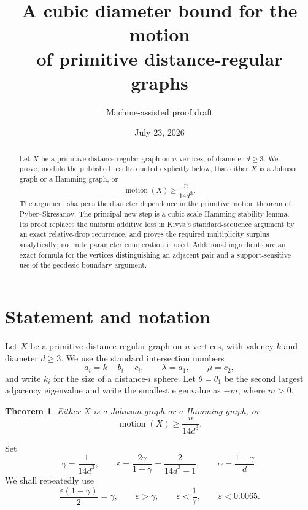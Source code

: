 \documentclass[11pt]{amsart}
\title[A cubic diameter bound for motion]{A cubic diameter bound for the motion\\of primitive distance-regular graphs}
\author{Machine-assisted proof draft}
\date{July 23, 2026}
\newtheorem{theorem}{Theorem}[section]
\theoremstyle{definition}
\newcommand{\mot}{\operatorname{motion}}
\newcommand{\eps}{\varepsilon}
\newcommand{\gam}{\gamma}
\begin{document}
\begin{abstract}
Let $X$ be a primitive distance-regular graph on $n$ vertices, of diameter $d\ge3$.
We prove, modulo the published results quoted explicitly below, that either $X$ is a Johnson graph or a Hamming graph, or
\[
 \mot(X)\ge \frac{n}{14d^3}.
\]
The argument sharpens the diameter dependence in the primitive motion theorem of Pyber--Skresanov.  The principal new step is a cubic-scale Hamming stability lemma.  Its proof replaces the uniform additive loss in Kivva's standard-sequence argument by an exact relative-drop recurrence, and proves the required multiplicity surplus analytically; no finite parameter enumeration is used.  Additional ingredients are an exact formula for the vertices distinguishing an adjacent pair and a support-sensitive use of the geodesic boundary argument.
\end{abstract}
\maketitle

\begin{center}
\end{center}

\section{Statement and notation}
Let $X$ be a primitive distance-regular graph on $n$ vertices, with valency $k$ and diameter $d\ge3$.  We use the standard intersection numbers
\[
 a_i=k-b_i-c_i,\qquad \lambda=a_1,\qquad \mu=c_2,
\]
and write $k_i$ for the size of a distance-$i$ sphere.  Let $\theta=\theta_1$ be the second largest adjacency eigenvalue and write the smallest eigenvalue as $-m$, where $m>0$.

\begin{theorem}\label{thm:main}
Either $X$ is a Johnson graph or a Hamming graph, or
\[
 \boxed{\mot(X)\ge \frac{n}{14d^3}.}
\]
\end{theorem}

Set
\begin{equation}\label{eq:parameters}
 \gam=\frac1{14d^3},\qquad
 \eps=\frac{2\gam}{1-\gam}=\frac2{14d^3-1},\qquad
 \alpha=\frac{1-\gam}{d}.
\end{equation}
We shall repeatedly use
\begin{equation}\label{eq:closure}
 \frac{\eps(1-\gam)}2=\gam,
 \qquad
 \eps>\gam,
 \qquad
 \eps<\frac17,
 \qquad
 \eps<0.0065.
\end{equation}
\end{document}
